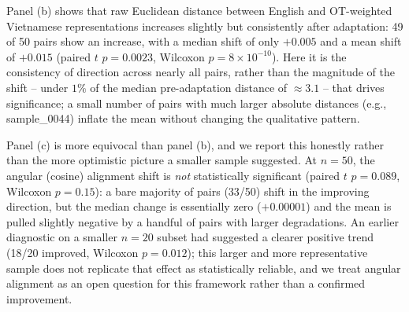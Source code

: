 \documentclass[11pt]{article}
\begin{document}
Panel (b) shows that raw Euclidean distance between English and OT-weighted Vietnamese representations increases slightly but consistently after adaptation: 49 of 50 pairs show an increase, with a median shift of only $+0.005$ and a mean shift of $+0.015$ (paired $t$ $p=0.0023$, Wilcoxon $p=8\times10^{-10}$). Here it is the consistency of direction across nearly all pairs, rather than the magnitude of the shift -- under $1\%$ of the median pre-adaptation distance of $\approx 3.1$ -- that drives significance; a small number of pairs with much larger absolute distances (e.g., sample\_0044) inflate the mean without changing the qualitative pattern.

Panel (c) is more equivocal than panel (b), and we report this honestly rather than the more optimistic picture a smaller sample suggested. At $n=50$, the angular (cosine) alignment shift is \emph{not} statistically significant (paired $t$ $p=0.089$, Wilcoxon $p=0.15$): a bare majority of pairs (33/50) shift in the improving direction, but the median change is essentially zero ($+0.00001$) and the mean is pulled slightly negative by a handful of pairs with larger degradations. An earlier diagnostic on a smaller $n=20$ subset had suggested a clearer positive trend (18/20 improved, Wilcoxon $p=0.012$); this larger and more representative sample does not replicate that effect as statistically reliable, and we treat angular alignment as an open question for this framework rather than a confirmed improvement.
\end{document}

